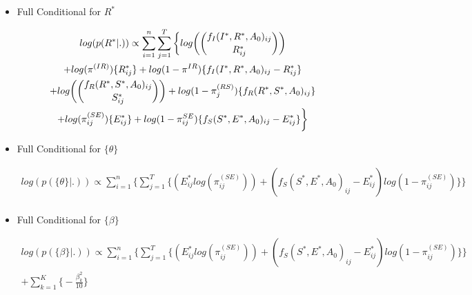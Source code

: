 \documentclass[12pt]{article}
\begin{document}
\begin{itemize}
    \item{Full Conditional for $R^*$}
    \begin{center}
    \begin{multline}
        \displaystyle
        log(p(R^*|.)) \propto \sum_{i=1}^n\sum_{j=1}^T\bigg\{log\bigg(\dbinom{f_I(I^*, R^*, A_0)_{ij}}{R^*_{ij}}\bigg)\\ + log(\pi^{(IR)})\{R^*_{ij}\}
            + log(1-\pi^{IR})\{f_I(I^*, R^*, A_0)_{ij} - R^*_{ij}\}\\
            + log\bigg(\dbinom{f_R(R^*, S^*, A_0)_{ij}}{S^*_{ij}}\bigg) + log(1-\pi_j^{(RS)})\{f_R(R^*, S^*, A_0)_{ij}\}\\ 
            + log(\pi_{ij}^{(SE)})\{E^*_{ij}\} + log(1-\pi_{ij}^{SE})\{f_S(S^*, E^*, A_0)_{ij} - E^*_{ij}\}\bigg\}\\ 
    \end{multline}
    \end{center}
    \item{Full Conditional for $\{\theta\}$}
    \begin{center}
    \begin{multline}
        \displaystyle
        log(p(\{\theta\}|.)) \propto \sum_{i=1}^n \bigg\{ \sum_{j=1}^T\Big\{
            (E^*_{ij}log(\pi_{ij}^{(SE)})) + (f_S(S^*, E^*, A_0)_{ij} - E^*_{ij})log(1-\pi_{ij}^{(SE)})\Big\}\bigg\} \\
    \end{multline}
    \end{center}

    \item{Full Conditional for $\{\beta\}$}
    \begin{center}
    \begin{multline}
        \displaystyle
        log(p(\{\beta\}|.)) \propto
            \sum_{i=1}^n \bigg\{ \sum_{j=1}^T\Big\{
            (E^*_{ij}log(\pi_{ij}^{(SE)})) + (f_S(S^*, E^*, A_0)_{ij} - E^*_{ij})log(1-\pi_{ij}^{(SE)})\Big\}\bigg\} \\
             + \sum_{k = 1}^K\bigg\{-\frac{\beta^2_k}{10}\bigg\}
    \end{multline}
    \end{center}


\end{itemize}
\end{document}
